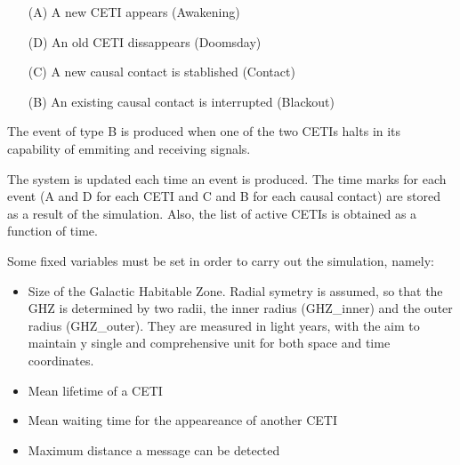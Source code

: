 \documentclass[useAMS,usenatbib]{mnras}
\begin{document}
\begin{enumerate}
   \item[(A)] A new CETI appears (Awakening)
   \item[(D)] An old CETI dissappears (Doomsday)
   \item[(C)] A new causal contact is stablished (Contact)
   \item[(B)] An existing causal contact is interrupted (Blackout)
\end{enumerate}


The event of type B is produced when one of the two CETIs halts in its
capability of emmiting and receiving signals.















The system is updated each time an event is produced.  The time marks
for each event (A and D for each CETI and C and B for each causal
contact) are stored as a result of the simulation.
%
Also, the list of active CETIs is obtained as a function of time.

Some fixed variables must be set in order to carry out the simulation,
namely:

\begin{itemize}
   \item Size of the Galactic Habitable Zone.  Radial symetry is
      assumed, so that the GHZ is determined by two radii, the inner
      radius (GHZ\_inner) and the outer radius (GHZ\_outer).  They are
      measured in light years, with the aim to maintain y single and
      comprehensive unit for both space and time coordinates.
   \item Mean lifetime of a CETI
   \item Mean waiting time for the appeareance of another CETI
   \item Maximum distance a message can be detected
\end{itemize}
\end{document}
